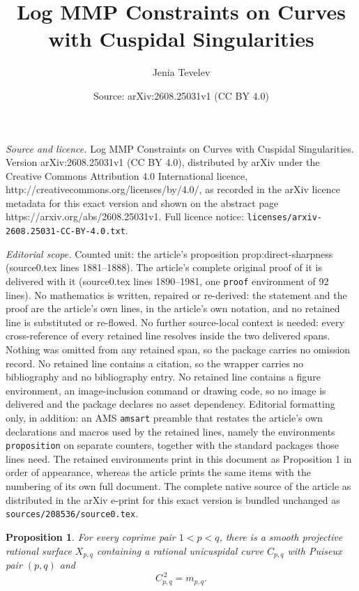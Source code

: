 \documentclass[10pt,a4paper]{amsart}
\title{Log MMP Constraints on Curves with Cuspidal Singularities}
\author{Jenia Tevelev}
\date{Source: arXiv:2608.25031v1 (CC BY 4.0)}
\newtheorem{proposition}{Proposition}
\begin{document}
\maketitle

\noindent\emph{Source and licence.} Log MMP Constraints on Curves with Cuspidal Singularities. Version arXiv:2608.25031v1 (CC BY 4.0), distributed by arXiv under the Creative Commons Attribution 4.0 International licence, http://creativecommons.org/licenses/by/4.0/, as recorded in the arXiv licence metadata for this exact version and shown on the abstract page https://arxiv.org/abs/2608.25031v1. Full licence notice: \texttt{licenses/arxiv-2608.25031-CC-BY-4.0.txt}.\par\smallskip

\noindent\textit{Editorial scope.} Counted unit: the article's proposition prop:direct-sharpness (source0.tex lines 1881--1888). The article's complete original proof of it is delivered with it (source0.tex lines 1890--1981, one \texttt{proof} environment of 92 lines). No mathematics is written, repaired or re-derived: the statement and the proof are the article's own lines, in the article's own notation, and no retained line is substituted or re-flowed.  No further source-local context is needed: every cross-reference of every retained line resolves inside the two delivered spans.  Nothing was omitted from any retained span, so the package carries no omission record.  No retained line contains a citation, so the wrapper carries no bibliography and no bibliography entry.  No retained line contains a figure environment, an image-inclusion command or drawing code, so no image is delivered and the package declares no asset dependency.  Editorial formatting only, in addition: an AMS \texttt{amsart} preamble that restates the article's own declarations and macros used by the retained lines, namely the environments \texttt{proposition} on separate counters, together with the standard packages those lines need.  The retained environments print in this document as Proposition 1 in order of appearance, whereas the article prints the same items with the numbering of its own full document.  The complete native source of the article as distributed in the arXiv e-print for this exact version is bundled unchanged as \texttt{sources/208536/source0.tex}.
\begin{proposition}\label{prop:direct-sharpness}
For every coprime pair $1<p<q$, there is a smooth projective rational surface
$X_{p,q}$ containing a rational unicuspidal curve $C_{p,q}$ with Puiseux pair
$(p,q)$ and
\[
 C_{p,q}^{\,2}=m_{p,q}.
\]
\end{proposition}
\end{document}
